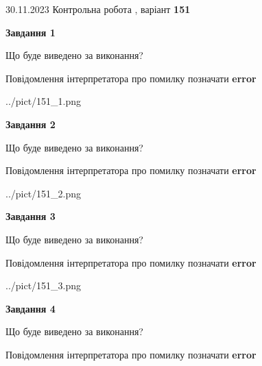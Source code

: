 \documentclass[12pt, ukrainian]{article}
\begin{document}
{{30.11.2023 Контрольна робота , варіант  \No \textbf { 151 }\par}}
{




{\begin {center}\textbf{Завдання 1}\end {center}}\par
Що буде виведено за виконання? \par
Повідомлення інтерпретатора про помилку позначати \textbf{error}

\begin{center}
	{../pict/151_1.png}
\end{center}
\newpage

{\begin {center}\textbf{Завдання 2}\end {center}}\par
Що буде виведено за виконання? \par
Повідомлення інтерпретатора про помилку позначати \textbf{error}

\begin{center}
	{../pict/151_2.png}
\end{center}
\newpage

{\begin {center}\textbf{Завдання 3}\end {center}}\par
Що буде виведено за виконання? \par
Повідомлення інтерпретатора про помилку позначати \textbf{error}

\begin{center}
	{../pict/151_3.png}
\end{center}
\newpage

{\begin {center}\textbf{Завдання 4}\end {center}}\par
Що буде виведено за виконання? \par
Повідомлення інтерпретатора про помилку позначати \textbf{error}

}
\end{document}
